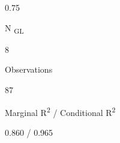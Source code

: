 \documentclass[
  letterpaper,
  DIV=11,
  numbers=noendperiod]{scrartcl}
\begin{document}
\begin{table}
\begin{minipage}[t]{\linewidth}
{0.75

}

\end{minipage}%
\newline
\begin{minipage}[t]{\linewidth}

{\centering 

N \textsubscript{GL}

}

\end{minipage}%
\newline
\begin{minipage}[t]{\linewidth}

{\centering 

8

}

\end{minipage}%
\newline
\begin{minipage}[t]{\linewidth}

{\centering 

Observations

}

\end{minipage}%
\newline
\begin{minipage}[t]{\linewidth}

{\centering 

87

}

\end{minipage}%
\newline
\begin{minipage}[t]{\linewidth}

{\centering 

Marginal R\textsuperscript{2} / Conditional R\textsuperscript{2}

}

\end{minipage}%
\newline
\begin{minipage}[t]{\linewidth}

{\centering 

0.860 / 0.965

}

\end{minipage}%

\end{table}
\end{document}
